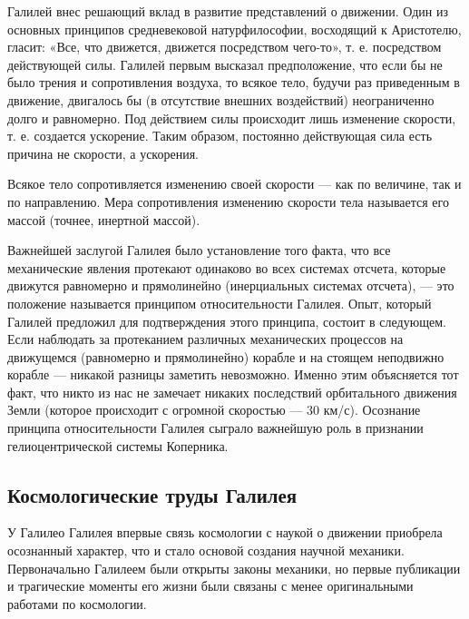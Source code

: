 \documentclass[
]{article}
\begin{document}
Галилей внес решающий вклад в развитие представлений о движении. Один из
основных принципов средневековой натурфилософии, восходящий к
Аристотелю, гласит: «Все, что движется, движется посредством чего-то»,
т. е. посредством действующей силы. Галилей первым высказал
предположение, что если бы не было трения и сопротивления воздуха, то
всякое тело, будучи раз приведенным в движение, двигалось бы (в
отсутствие внешних воздействий) неограниченно долго и равномерно. Под
действием силы происходит лишь изменение скорости, т. е. создается
ускорение. Таким образом, постоянно действующая сила есть причина не
скорости, а ускорения.

Всякое тело сопротивляется изменению своей скорости --- как по величине,
так и по направлению. Мера сопротивления изменению скорости тела
называется его массой (точнее, инертной массой).

Важнейшей заслугой Галилея было установление того факта, что все
механические явления протекают одинаково во всех системах отсчета,
которые движутся равномерно и прямолинейно (инерциальных системах
отсчета), --- это положение называется принципом относительности
Галилея. Опыт, который Галилей предложил для подтверждения этого
принципа, состоит в следующем. Если наблюдать за протеканием различных
механических процессов на движущемся (равномерно и прямолинейно) корабле
и на стоящем неподвижно корабле --- никакой разницы заметить невозможно.
Именно этим объясняется тот факт, что никто из нас не замечает никаких
последствий орбитального движения Земли (которое происходит с огромной
скоростью --- 30 км/с). Осознание принципа относительности Галилея
сыграло важнейшую роль в признании гелиоцентрической системы Коперника.

\hypertarget{ux43aux43eux441ux43cux43eux43bux43eux433ux438ux447ux435ux441ux43aux438ux435-ux442ux440ux443ux434ux44b-ux433ux430ux43bux438ux43bux435ux44f}{%
\subsection{Космологические труды
Галилея}\label{ux43aux43eux441ux43cux43eux43bux43eux433ux438ux447ux435ux441ux43aux438ux435-ux442ux440ux443ux434ux44b-ux433ux430ux43bux438ux43bux435ux44f}}

У Галилео Галилея впервые связь космологии с наукой о движении приобрела
осознанный характер, что и стало основой создания научной механики.
Первоначально Галилеем были открыты законы механики, но первые
публикации и трагические моменты его жизни были связаны с менее
оригинальными работами по космологии.
\end{document}
